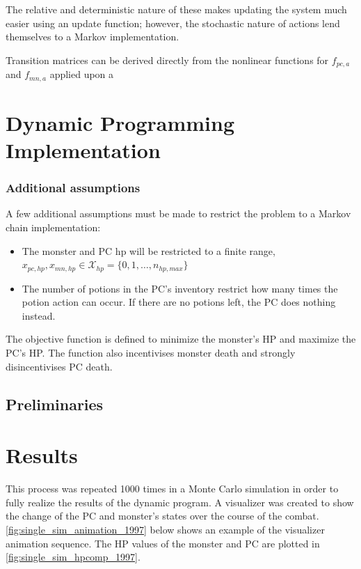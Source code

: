 \documentclass[letterpaper, 10 pt, conference]{ieeeconf}
\begin{document}
The relative and deterministic nature of these makes updating the system much easier using an update function; however, the stochastic nature of actions lend themselves to a Markov implementation.

Transition matrices can be derived directly from the nonlinear functions for $f_{pc,a}$ and $f_{mn,a}$ applied upon a 




\section{Dynamic Programming Implementation}

\subsubsection{Additional assumptions}
A few additional assumptions must be made to restrict the problem to a Markov chain implementation:
\begin{itemize}
    \item The monster and PC hp will be restricted to a finite range, $x_{pc,hp},x_{mn,hp} \in \mathcal{X}_{hp} = \{0,1,\dots, n_{hp,max}\}$
    \item The number of potions in the PC's inventory restrict how many times the potion action can occur. If there are no potions left, the PC does nothing instead.
\end{itemize}


The objective function is defined to minimize the monster's HP and maximize the PC's HP. The function also incentivises monster death and strongly disincentivises PC death.



\subsection{Preliminaries}








\section{Results}
This process was repeated 1000 times in a Monte Carlo simulation in order to fully realize the results of the 
dynamic program. A visualizer was created to show the change of the PC and monster's states over the course of the 
combat. \cref{fig:single_sim_animation_1997} below shows an example of the visualizer animation sequence. The HP values of the monster and PC 
are plotted in \cref{fig:single_sim_hpcomp_1997}.
\end{document}
